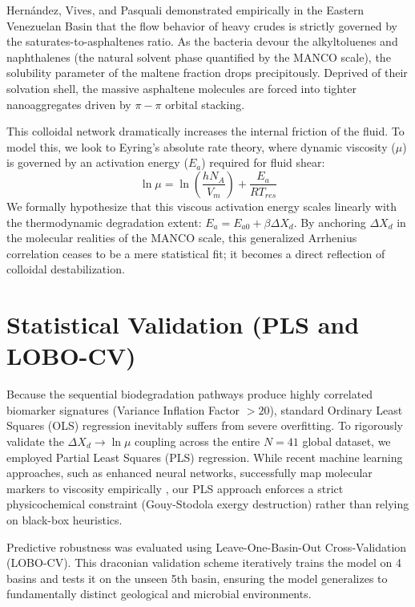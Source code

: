 \documentclass[review,12pt]{elsarticle}
\begin{document}
Hern\'andez, Vives, and Pasquali \cite{hernandez1983} demonstrated empirically in the Eastern Venezuelan Basin that the flow behavior of heavy crudes is strictly governed by the saturates-to-asphaltenes ratio. As the bacteria devour the alkyltoluenes and naphthalenes (the natural solvent phase quantified by the MANCO scale), the solubility parameter of the maltene fraction drops precipitously. Deprived of their solvation shell, the massive asphaltene molecules are forced into tighter nanoaggregates driven by $\pi-\pi$ orbital stacking. 

This colloidal network dramatically increases the internal friction of the fluid. To model this, we look to Eyring's absolute rate theory, where dynamic viscosity ($\mu$) is governed by an activation energy ($E_a$) required for fluid shear:
\begin{equation}
\ln \mu = \ln \left( \frac{h N_A}{V_m} \right) + \frac{E_a}{R T_{res}}
\end{equation}
We formally hypothesize that this viscous activation energy scales linearly with the thermodynamic degradation extent: $E_a = E_{a0} + \beta \Delta X_d$. By anchoring $\Delta X_d$ in the molecular realities of the MANCO scale, this generalized Arrhenius correlation ceases to be a mere statistical fit; it becomes a direct reflection of colloidal destabilization. 

\section{Statistical Validation (PLS and LOBO-CV)}
Because the sequential biodegradation pathways produce highly correlated biomarker signatures (Variance Inflation Factor $> 20$), standard Ordinary Least Squares (OLS) regression inevitably suffers from severe overfitting. To rigorously validate the $\Delta X_d \to \ln \mu$ coupling across the entire $N=41$ global dataset, we employed Partial Least Squares (PLS) regression. While recent machine learning approaches, such as enhanced neural networks, successfully map molecular markers to viscosity empirically \cite{li2025}, our PLS approach enforces a strict physicochemical constraint (Gouy-Stodola exergy destruction) rather than relying on black-box heuristics.

Predictive robustness was evaluated using Leave-One-Basin-Out Cross-Validation (LOBO-CV). This draconian validation scheme iteratively trains the model on 4 basins and tests it on the unseen 5th basin, ensuring the model generalizes to fundamentally distinct geological and microbial environments.
\end{document}
